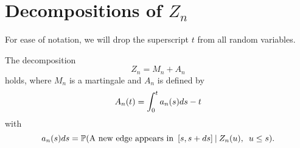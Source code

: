 

\section{Decompositions of $Z_n$}

For ease of notation, we will drop the superscript $t$ from all random variables.


\begin{lemma} \label{L: decomp Zn}
	The decomposition 
	\begin{equation} \label{E: decomp Zn}
	Z_n = M_n + A_n
	\end{equation}
	holds, where $M_n$ is a martingale and $A_n$ is defined by
	\begin{equation} \label{D: An}
	A_n(t) = \int_{0}^{t} a_n(s)ds - t
	\end{equation}
	with
	\begin{equation} \label{D: an}
	a_n(s)ds = \mathbb{P}(\text{A new edge appears in} \enspace [s, s+ds] \: | \: Z_n(u), \enspace u \leq s).
	\end{equation}	
\end{lemma}

